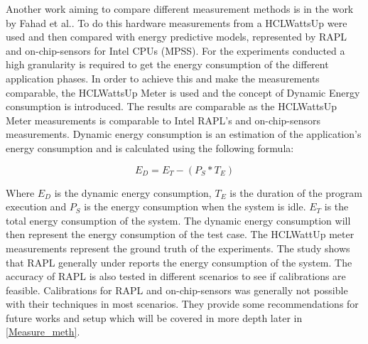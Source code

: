 
Another work aiming to compare different measurement methods is in the work by Fahad et al.\cite{fahad2019comparative}. To do this hardware measurements from a HCLWattsUp were used and then compared with energy predictive models, represented by RAPL and on-chip-sensors for Intel CPUs (MPSS). For the experiments conducted a high granularity is required to get the energy consumption of the different application phases. In order to achieve this and make the measurements comparable, the HCLWattsUp Meter is used and the concept of Dynamic Energy consumption is introduced. The results are comparable as the HCLWattsUp Meter measurements is comparable to Intel RAPL's and on-chip-sensors measurements. Dynamic energy consumption is an estimation of the application's energy consumption and is calculated using the following formula:\cite{fahad2019comparative}

\begin{equation}
    E_D = E_T - (P_S * T_E)
\end{equation}

Where $E_D$ is the dynamic energy consumption, $T_E$ is the duration of the program execution and $P_S$ is the energy consumption when the system is idle. $E_T$ is the total energy consumption of the system. The dynamic energy consumption will then represent the energy consumption of the test case. The HCLWattUp meter measurements represent the ground truth of the experiments. The study shows that RAPL generally under reports the energy consumption of the system. The accuracy of RAPL is also tested in different scenarios to see if calibrations are feasible. Calibrations for RAPL and on-chip-sensors was generally not possible with their techniques in most scenarios. They provide some recommendations for future works and setup which will be covered in more depth later in \ref{Measure_meth}.